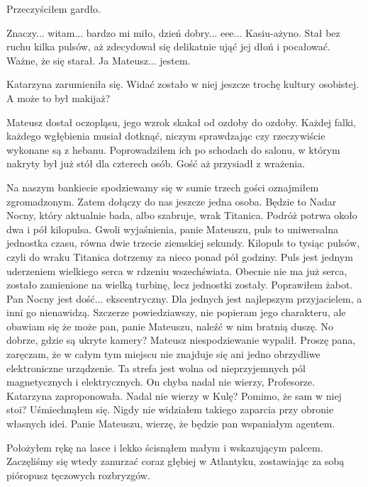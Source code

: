 Przeczyściłem gardło.
\begin{dialogue}
\ds{} Znaczy... witam... bardzo mi miło, dzień dobry... eee... Kasiu-ażyno. \dm{} Stał bez ruchu kilka pulsów, aż zdecydował się delikatnie ująć jej dłoń i pocałować.
Ważne, że się starał. \dm{} Ja Mateusz... jestem.
\end{dialogue}

Katarzyna zarumieniła się. Widać zostało w niej jeszcze trochę kultury osobistej. A może to był makijaż?

Mateusz dostał oczopląsu, jego wzrok skakał od ozdoby do ozdoby. Każdej falki, każdego wgłębienia musiał dotknąć, niczym sprawdzając czy rzeczywiście wykonane są z hebanu. 
Poprowadziłem ich po schodach do salonu, w którym nakryty był już stół dla czterech osób.
Gość aż przysiadł z wrażenia.
\begin{dialogue}
\ds{} Na naszym bankiecie spodziewamy się w sumie trzech gości \dm{} oznajmiłem zgromadzonym. \dm{} Zatem dołączy do nas jeszcze jedna osoba.
Będzie to Nadar Nocny, który aktualnie bada, albo szabruje, wrak Titanica. Podróż potrwa około dwa i pół kilopulsa. 
Gwoli wyjaśnienia, panie Mateuszu, puls to uniwersalna jednostka czasu, równa dwie trzecie ziemskiej sekundy.
Kilopuls to tysiąc pulsów, czyli do wraku Titanica dotrzemy za nieco ponad pół godziny. Puls jest jednym uderzeniem wielkiego serca w rdzeniu wszechświata. Obecnie nie ma już serca, zostało zamienione na wielką turbinę, lecz jednostki zostały.
\dm{} Poprawiłem żabot. \dm{}
Pan Nocny jest dość... ekscentryczny. Dla jednych jest najlepszym przyjacielem, a inni go nienawidzą.
Szczerze powiedziawszy, nie popieram jego charakteru, ale obawiam się że może pan, panie Mateuszu, naleźć w nim bratnią duszę.
\ds{} No dobrze, gdzie są ukryte kamery? \dm{} Mateusz niespodziewanie wypalił.
\ds{} Proszę pana, zaręczam, że w całym tym miejscu nie znajduje się ani jedno obrzydliwe elektroniczne urządzenie. Ta strefa jest wolna od nieprzyjemnych pól magnetycznych i elektrycznych.
\ds{} On chyba nadal nie wierzy, Profesorze. \dm{} Katarzyna zaproponowała. 
\ds{} Nadal nie wierzy w Kulę? Pomimo, że sam w niej stoi? \dm{} Uśmiechnąłem się. Nigdy nie widziałem takiego zaparcia przy obronie własnych idei. \dm{} Panie Mateuszu, wierzę, że będzie pan wspaniałym agentem.
\end{dialogue}


Położyłem rękę na lasce i lekko ścisnąłem małym i wskazującym palcem.
Zaczęliśmy się wtedy zanurzać coraz głębiej w Atlantyku, zostawiając za sobą pióropusz tęczowych rozbryzgów.


